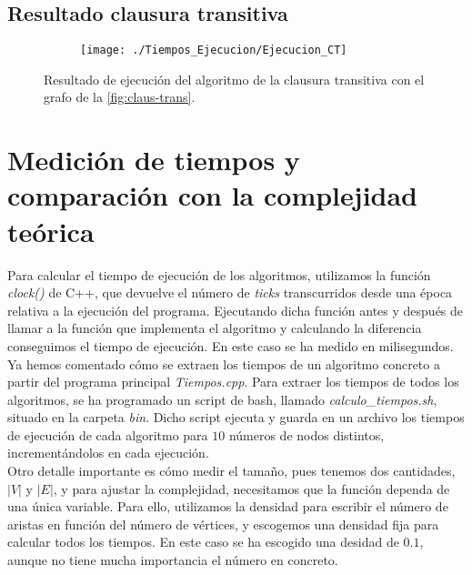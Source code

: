 \subsection{Resultado clausura transitiva}

\begin{figure}[!htb]
	\centering
	\begin{subfigure}{\linewidth}
		\texttt{[image: ./Tiempos\_Ejecucion/Ejecucion\_CT]}
	\end{subfigure}
	
	\caption{Resultado de ejecución del algoritmo de la clausura transitiva con el grafo de la \autoref{fig:claus-trans}.}
	\label{fig:resultado_CT}
\end{figure}

\section{Medición de tiempos y comparación con la complejidad teórica}

Para calcular el tiempo de ejecución de los algoritmos, utilizamos la función \textit{clock()} de C++, que devuelve el número de \textit{ticks} transcurridos desde una época relativa a la ejecución del programa. Ejecutando dicha función antes y después de llamar a la función que implementa el algoritmo y calculando la diferencia conseguimos el tiempo de ejecución. En este caso se ha medido en milisegundos. \\

Ya hemos comentado cómo se extraen los tiempos de un algoritmo concreto a partir del programa principal \textit{Tiempos.cpp}. Para extraer los tiempos de todos los algoritmos, se ha programado un script de bash, llamado \textit{calculo\_tiempos.sh}, situado en la carpeta \textit{bin}. Dicho script ejecuta y guarda en un archivo los tiempos de ejecución de cada algoritmo para $10$ números de nodos distintos, incrementándolos en cada ejecución. \\

Otro detalle importante es cómo medir el tamaño, pues tenemos dos cantidades, $|V|$ y $|E|$, y para ajustar la complejidad, necesitamos que la función dependa de una única variable. Para ello, utilizamos la densidad para escribir el número de aristas en función del número de vértices, y escogemos una densidad fija para calcular todos los tiempos. En este caso se ha escogido una desidad de $0.1$, aunque no tiene mucha importancia el número en concreto. \\


